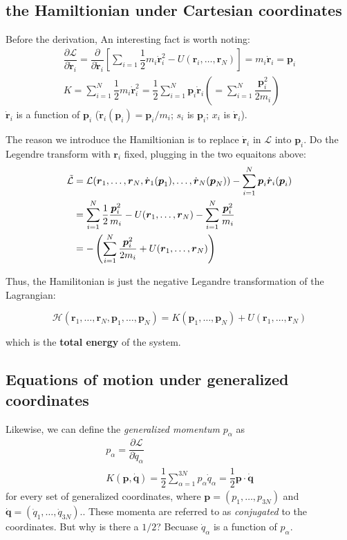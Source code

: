 \documentclass[
  10pt,
  twoside,
  openany,
  b5paper, %
  colorscheme = bootstrap-v4, %
]{qyxf-book}
\numberwithin{equation}{section}
\newcommand{\p}[2]{\dfrac{\partial #1}{\partial #2}}
\newcommand{\vr}{\boldsymbol{r}}
\newcommand{\vp}{\boldsymbol{p}}
\newcommand{\vq}{\boldsymbol{q}}
\newcommand{\dvr}{\dot{\vr}}
\newcommand{\dvq}{\dot{\vq}}
\newcommand{\half}{\dfrac{1}{2}}
\newcommand{\sumin}{\sum_{i=1}^N}
\newcommand{\suman}{\sum_{\alpha=1}^{3N}}
\newcommand{\lag}{\mathcal{L}} %
\newcommand{\ham}{\mathcal{H}} %
\begin{document}
\vspace{1em}
\subsection{the Hamiltionian under Cartesian coordinates}

Before the derivation, An interesting fact is worth noting:
\begin{gather}
	\p{\lag}{\dvr_i}=\p{}{\dvr_i}\left[\sum_{i=1}\half m_i\dvr_i^2-U(\vr_i,\dots,\vr_N)\right]=m_i\dvr_i=\vp_i\\
	K=\sumin\half m_i\dvr_i^2=\half\sumin\vp_i\dvr_i\left(=\sumin\dfrac{\vp_i^2}{2m_i}\right)
\end{gather}
$\dvr_i$ is a function of $\vp_i$ ($\dvr_i(\vp_i)=\vp_i/m_i$; $s_i$ is $\vp_i$; $x_i$ is $\dvr_i$). 

The reason we introduce the Hamiltionian is to replace $\dvr_i$ in $\lag$ into $\vp_i$. Do the Legendre transform with $\vr_i$ fixed, plugging in the two equaitons above:
\begin{align}
	\tilde{\lag}&=\lag(\vr_1,\dots,\vr_N,\dvr_1(\vp_1),\dots,\dvr_N(\vp_N))-\sumin \vp_i\dvr_i(\vp_i) \notag\\
	&=\sumin\half \dfrac{\vp_i^2}{m_i}-U(\vr_1,\dots,\vr_N)-\sumin \dfrac{\vp_i^2}{m_i} \notag\\
	&=-\left(\sumin \dfrac{\vp_i^2}{2m_i}+U(\vr_1,\dots,\vr_N)\right)
\end{align}

Thus, the Hamilitonian is just the negative Legandre transformation of the Lagrangian:
\begin{tcolorbox}
	\begin{equation}
		\ham(\vr_1,\dots,\vr_N,\vp_1,\dots,\vp_N)=K(\vp_1,\dots,\vp_N)+U(\vr_1,\dots,\vr_N)
	\end{equation}
\end{tcolorbox}
which is the \textbf{total energy} of the system.

\subsection{Equations of motion under generalized coordinates}

Likewise, we can define the \textit{generalized momentum} $p_\alpha$ as
\begin{gather}
	p_\alpha=\p{\lag}{\dot{q}_\alpha} \label{eq:palpha}\\
	K(\vp,\dvq)=\half\suman p_\alpha\dot{q}_\alpha=\half\vp\cdot\dvq \label{eq:kinetic-general}
\end{gather}
for every set of generalized coordinates, where $\vp=(p_1,\dots,p_{3N})$ and $\dvq=(\dot{q}_1,\dots,\dot{q}_{3N})$.. These momenta are referred to as \textit{conjugated} to the coordinates. But why is there a $1/2$? Becuase $\dot{q}_\alpha$ is a function of $p_\alpha$.
\end{document}
